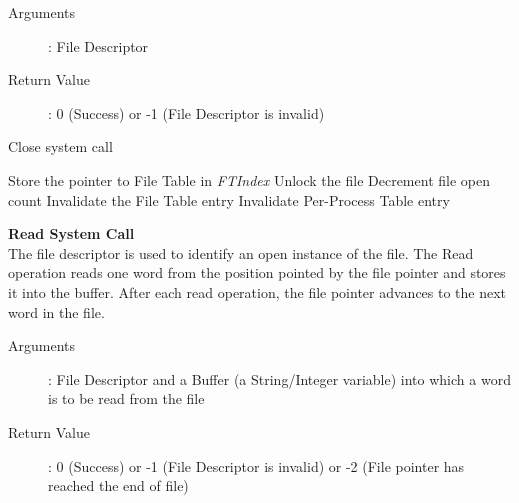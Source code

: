 \documentclass[10pt]{article}
\begin{document}
\begin{description}
	\item[Arguments]: File Descriptor
	\item[Return Value]: 0 (Success) or -1 (File Descriptor is invalid)
\end{description} 
\begin{algorithm}
\caption{Close system call}
\begin{algorithmic}
\ENDIF
{}
\ELSE 
    \STATE Store the pointer to File Table in  \textit{FTIndex}
\ENDIF
{}
    \STATE Unlock the file
\ENDIF
\STATE Decrement file open count
    \STATE Invalidate the File Table entry
    \ENDIF
\STATE Invalidate Per-Process Table entry 
\end{algorithmic}
\end{algorithm}
\textbf{Read System Call}
\vspace{2mm}\\
The file descriptor is used to identify an open instance of the file. The Read operation reads one word from the position pointed by the file pointer and stores it into the buffer. After each read operation, the file pointer advances to the next word in the file. 
\begin{description}
	\item[Arguments]: File Descriptor and a Buffer (a String/Integer variable) into which a word is to be read from the file
	\item[Return Value]: 0 (Success) or -1 (File Descriptor is invalid) or -2 (File pointer has reached the end of file)
\end{description} 
\end{document}
